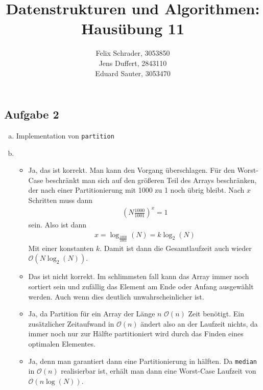 \documentclass[11pt]{article}
\author{
  Felix Schrader, 3053850 \\ 
  Jens Duffert, 2843110 \\
  Eduard Sauter, 3053470
}
\title{Datenstrukturen und Algorithmen: Haus\"ubung 11}
\begin{document}
\maketitle
\subsection*{Aufgabe 2}
\begin{enumerate}[a)]
  \item Implementation von \texttt{partition}
    
  \item
    \begin{itemize}
      \item Ja, das ist korrekt. Man kann den Vorgang überschlagen.
        Für den Worst-Case beschränkt man sich auf den größeren Teil des
        Arrays beschränken, der nach einer Partitionierung mit
        1000 zu 1 noch übrig bleibt. Nach $x$ Schritten muss dann
        \begin{align*}
          \left( N \frac{1000}{1001} \right)^x = 1
        \end{align*}
        sein.
        Also ist dann
        \begin{align*}
          x = \log_{\frac{1000}{1001}} (N) =  k \log_2(N)
        \end{align*}
        Mit einer konstanten $k$. Damit ist dann die Gesamtlaufzeit auch
        wieder $\mathcal{O}(N \log_2(N))$.

      \item Das ist nicht korrekt. Im schlimmsten fall kann das Array immer
        noch sortiert sein und zufällig das Element am Ende oder Anfang ausgewählt
        werden. Auch wenn dies deutlich unwahrscheinlicher ist.

      \item Ja, da Partition für ein Array der Länge $n$ $\mathcal{O}(n)$
        Zeit benötigt. Ein zusätzlicher Zeitaufwand in $\mathcal{O}(n)$ ändert
        also an der Laufzeit nichts, da immer noch nur zur Hälfte partitioniert
        wird durch das Finden eines optimalen Elementes.

      \item Ja, denn man garantiert dann eine Partitionierung in hälften.
        Da \texttt{median} in $\mathcal{O}(n)$ realisierbar ist, erhält man
        dann eine Worst-Case Laufzeit von $\mathcal{O}(n \log(N))$.

    \end{itemize}
\end{enumerate} 
\end{document}
